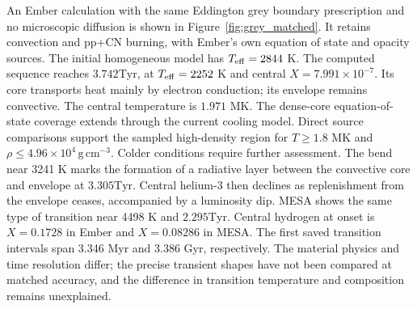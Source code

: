 \documentclass[11pt,letterpaper]{article}
\newcommand{\Tyr}{\mathrm{Tyr}}
\begin{document}
An Ember calculation with the same Eddington grey boundary prescription
and no microscopic diffusion is shown in Figure~\ref{fig:grey_matched}.
It retains convection and pp+CN burning, with Ember's own equation of state
and opacity sources. The initial homogeneous model has $T_{\rm eff}=2844$ K.
The computed sequence reaches $3.742\Tyr$, at $T_{\rm eff}=2252$ K and
central $X=7.991\times10^{-7}$. Its core transports heat mainly by electron conduction; its envelope remains convective. The central temperature is $1.971$ MK.
The dense-core equation-of-state coverage extends through the current
cooling model. Direct source comparisons support the sampled high-density region for
$T\geq1.8$ MK and $\rho\leq4.96\times10^4\,\mathrm{g\,cm^{-3}}$.
Colder conditions require further assessment.
The bend near 3241 K marks the formation of a radiative layer between the
convective core and envelope at $3.305\Tyr$. Central helium-3 then declines
as replenishment from the envelope ceases, accompanied by a luminosity dip.
MESA shows the same type of transition near 4498 K and $2.295\Tyr$.
Central hydrogen at onset is $X=0.1728$ in Ember and $X=0.08286$ in MESA.
The first saved transition intervals span 3.346 Myr and 3.386 Gyr,
respectively. The material physics and time resolution differ; the precise
transient shapes have not been compared at matched accuracy, and the
difference in transition temperature and composition remains unexplained.
\end{document}
